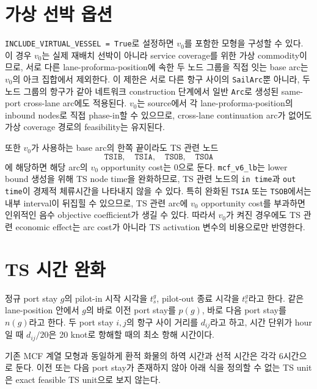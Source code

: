 \documentclass[11pt]{article}
\begin{document}
\section{가상 선박 옵션}

\texttt{INCLUDE\_VIRTUAL\_VESSEL = True}로 설정하면 $v_0$를 포함한 모형을 구성할 수
있다. 이 경우 $v_0$는 실제 재배치 선박이 아니라 service coverage를 위한 가상
commodity이므로, 서로 다른 lane-proforma-position에 속한 두 노드 그룹을 직접 잇는
base arc는 $v_0$의 아크 집합에서 제외한다. 이 제한은 서로 다른 항구 사이의
\texttt{SailArc}뿐 아니라, 두 노드 그룹의 항구가 같아 네트워크 construction 단계에서
일반 \texttt{Arc}로 생성된 same-port cross-lane arc에도 적용된다. $v_0$는 source에서
각 lane-proforma-position의 inbound nodes로 직접 phase-in할 수 있으므로, cross-lane
continuation arc가 없어도 가상 coverage 경로의 feasibility는 유지된다.

또한 $v_0$가 사용하는 base arc의 한쪽 끝이라도 TS 관련 노드
\[
  \texttt{TSIB},\quad \texttt{TSIA},\quad \texttt{TSOB},\quad \texttt{TSOA}
\]
에 해당하면 해당 arc의 $v_0$ opportunity cost는 0으로 둔다. \texttt{mcf\_v6\_lb}는
lower bound 생성을 위해 TS node time을 완화하므로, TS 관련 노드의 \texttt{in time}과
\texttt{out time}이 경제적 체류시간을 나타내지 않을 수 있다. 특히 완화된
\texttt{TSIA} 또는 \texttt{TSOB}에서는 내부 interval이 뒤집힐 수 있으므로, TS 관련
arc에 $v_0$ opportunity cost를 부과하면 인위적인 음수 objective coefficient가
생길 수 있다. 따라서 $v_0$가 켜진 경우에도 TS 관련 economic effect는 arc cost가
아니라 TS activation 변수의 비용으로만 반영한다.

\section{TS 시간 완화}

정규 port stay $g$의 pilot-in 시작 시각을 $t^g_s$, pilot-out 종료 시각을
$t^g_e$라고 한다. 같은 lane-position 안에서 $g$의 바로 이전 port stay를 $p(g)$,
바로 다음 port stay를 $n(g)$라고 한다. 두 port stay $i,j$의 항구 사이 거리를
$d_{ij}$라고 하고, 시간 단위가 hour일 때 $d_{ij}/20$은 20 knot로 항해할 때의
최소 항해 시간이다.

기존 MCF 계열 모형과 동일하게 환적 화물의 하역 시간과 선적 시간은 각각 6시간으로
둔다. 이전 또는 다음 port stay가 존재하지 않아 아래 식을 정의할 수 없는 TS unit은
exact feasible TS unit으로 보지 않는다.
\end{document}
